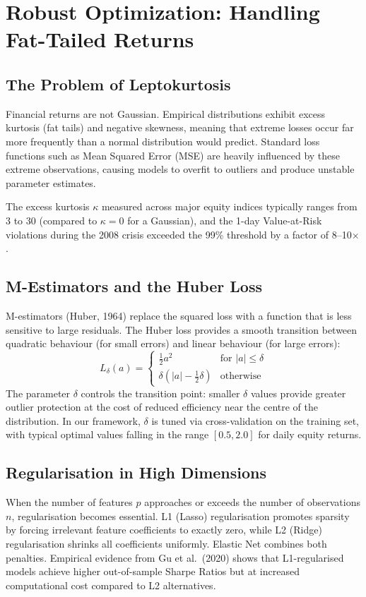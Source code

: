 \documentclass[conference]{IEEEtran}
\begin{document}
\section{Robust Optimization: Handling Fat-Tailed Returns}

\subsection{The Problem of Leptokurtosis}
Financial returns are not Gaussian. Empirical distributions exhibit excess kurtosis (fat tails) and negative skewness, meaning that extreme losses occur far more frequently than a normal distribution would predict. Standard loss functions such as Mean Squared Error (MSE) are heavily influenced by these extreme observations, causing models to overfit to outliers and produce unstable parameter estimates.

The excess kurtosis $\kappa$ measured across major equity indices typically ranges from 3 to 30 (compared to $\kappa = 0$ for a Gaussian), and the 1-day Value-at-Risk violations during the 2008 crisis exceeded the 99\% threshold by a factor of 8--10$\times$.

\subsection{M-Estimators and the Huber Loss}
M-estimators (Huber, 1964) replace the squared loss with a function that is less sensitive to large residuals. The Huber loss provides a smooth transition between quadratic behaviour (for small errors) and linear behaviour (for large errors):
\begin{equation}
L_{\delta}(a) =
\begin{cases}
\frac{1}{2} a^2 & \text{for } |a| \le \delta \\[4pt]
\delta \left( |a| - \frac{1}{2}\delta \right) & \text{otherwise}
\end{cases}
\end{equation}
The parameter $\delta$ controls the transition point: smaller $\delta$ values provide greater outlier protection at the cost of reduced efficiency near the centre of the distribution. In our framework, $\delta$ is tuned via cross-validation on the training set, with typical optimal values falling in the range $[0.5, 2.0]$ for daily equity returns.

\subsection{Regularisation in High Dimensions}
When the number of features $p$ approaches or exceeds the number of observations $n$, regularisation becomes essential. L1 (Lasso) regularisation promotes sparsity by forcing irrelevant feature coefficients to exactly zero, while L2 (Ridge) regularisation shrinks all coefficients uniformly. Elastic Net combines both penalties. Empirical evidence from Gu et al.\ (2020) shows that L1-regularised models achieve higher out-of-sample Sharpe Ratios but at increased computational cost compared to L2 alternatives.
\end{document}
